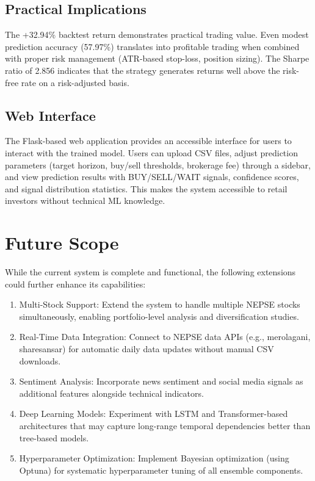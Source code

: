 \documentclass[12pt, a4paper]{report}
\begin{document}
	\subsection{Practical Implications}
	The +32.94\% backtest return demonstrates practical trading value. Even modest prediction accuracy (57.97\%) translates into profitable trading when combined with proper risk management (ATR-based stop-loss, position sizing). The Sharpe ratio of 2.856 indicates that the strategy generates returns well above the risk-free rate on a risk-adjusted basis.
	
	\subsection{Web Interface}
	The Flask-based web application provides an accessible interface for users to interact with the trained model. Users can upload CSV files, adjust prediction parameters (target horizon, buy/sell thresholds, brokerage fee) through a sidebar, and view prediction results with BUY/SELL/WAIT signals, confidence scores, and signal distribution statistics. This makes the system accessible to retail investors without technical ML knowledge.
	
	\section{Future Scope}
	While the current system is complete and functional, the following extensions could further enhance its capabilities:
	\vspace{-18pt}
	\begin{enumerate}
		\renewcommand{\labelenumi}{\roman{enumi}.}
		\item Multi-Stock Support: Extend the system to handle multiple NEPSE stocks simultaneously, enabling portfolio-level analysis and diversification studies.
		\item Real-Time Data Integration: Connect to NEPSE data APIs (e.g., merolagani, sharesansar) for automatic daily data updates without manual CSV downloads.
		\item Sentiment Analysis: Incorporate news sentiment and social media signals as additional features alongside technical indicators.
		\item Deep Learning Models: Experiment with LSTM and Transformer-based architectures that may capture long-range temporal dependencies better than tree-based models.
		\item Hyperparameter Optimization: Implement Bayesian optimization (using Optuna) for systematic hyperparameter tuning of all ensemble components.
	\end{enumerate}
	
\end{document}
